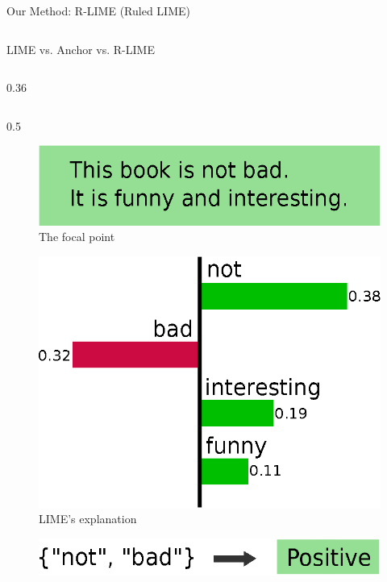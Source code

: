 \documentclass[unicode]{beamer}
\begin{document}
\begin{frame}
\begin{columns}[t]
\begin{column}{\rcol\linewidth}
\begin{block}{Our Method: R-LIME (Ruled LIME)}
			\end{block}
		\end{column}
	\end{columns}
	\vspace{.8em}
	\begin{columns}[t]
		\begin{column}{.97\linewidth}
			\begin{block}{LIME vs. Anchor vs. R-LIME}
				\begin{columns}
					\def\lcol{0.36}
					\def\ccol{0.23}
					\def\rcol{0.38}
					\begin{column}{\lcol\textwidth}
						\def\lcol{0.5}
						\def\rcol{0.45}
						\begin{columns}[]
							\begin{column}{\lcol\textwidth}
								\begin{figure}
									\includegraphics[width=\textwidth]{src/img/example-instance}

									\vspace{-0.3em}
									\caption{The focal point}
								\end{figure}
								\vspace{0.5em}
								\begin{figure}
									\includegraphics[width=\textwidth]{src/img/example-lime}
									\caption{LIME's explanation}
								\end{figure}
								\vspace{0.5em}
								\begin{figure}
									\includegraphics[width=\textwidth]{src/img/example-anchor}


\end{figure}
\end{column}
\end{columns}
\end{column}
\end{columns}
\end{block}
\end{column}
\end{columns}
\end{frame}
\end{document}
